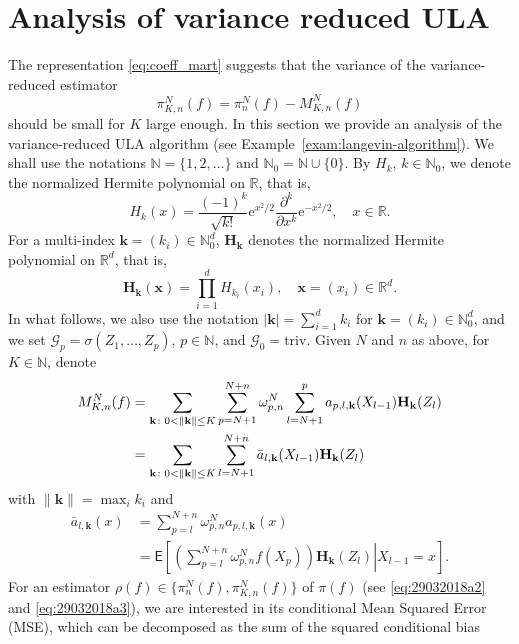 \documentclass[preprint]{imsart}
\def\rme{\mathrm{e}}
\begin{document}
\section{Analysis of variance reduced ULA}
\label{sec:ula_analysis}
The representation \eqref{eq:coeff_mart} suggests that the variance of  the  variance-reduced estimator
\begin{equation}
\label{eq:29032018a3}
\pi_{K,n}^N(f)=\pi_n^N(f)-M_{K,n}^N(f)
\end{equation}
should be small for \(K\) large enough. In this section   we provide  an analysis of the variance-reduced ULA  algorithm (see Example~\ref{exam:langevin-algorithm}).
We shall use the notations $\mathbb N=\{1,2,\ldots\}$ and $\mathbb N_0=\mathbb N\cup\{0\}$.
By $H_k$, $k\in\mathbb N_0$,
we denote the normalized Hermite polynomial on $\mathbb R$, that is,
$$
H_k(x)=\frac{(-1)^k}{\sqrt{k!}}\rme^{x^2/2}\frac{\partial^k}{\partial x^k}\rme^{-x^2/2},
\quad x\in\mathbb R.
$$
For a multi-index $\mathbf{k}=(k_i)\in\mathbb N_0^d$,
$\mathbf{H}_\mathbf{k}$ denotes the normalized Hermite polynomial on $\mathbb R^d$, that is,
$$
\mathbf{H}_\mathbf{k}(\mathbf{x})=\prod_{i=1}^d H_{k_i}(x_i),\quad \mathbf{x}=(x_i)\in\mathbb R^d.
$$
In what follows, we also use the notation
$|\mathbf{k}|=\sum_{i=1}^d k_i$ for $\mathbf{k}=(k_i)\in\mathbb N_0^d$,
and we set $\mathcal G_p=\sigma(Z_1,\ldots,Z_p)$, $p\in\mathbb N$, and $\mathcal G_0=\mathrm{triv}$.
Given $N$ and $n$ as above, for $K\in\mathbb N$, denote
\begin{align}
M_{K,n}^N(f) & =\sum_{\mathbf k\colon 0<\|\mathbf{k}\|\le K}\sum_{p=N+1}^{N+n}\omega_{p,n}^{N}\sum_{l=N+1}^{p}a_{p,l,\mathbf{k}}(X_{l-1})\mathbf{H}_\mathbf{k}(Z_{l})
\label{eq:29032018a5}\\
&=\sum_{\mathbf k\colon 0<\|\mathbf{k}\|\le K}\sum_{l=N+1}^{N+n}\bar{a}_{l,\mathbf{k}}(X_{l-1})\mathbf{H}_\mathbf{k}(Z_{l})
\notag
\end{align}
with \(\|\mathbf{k}\|=\max_{i} k_i\) and
\begin{align*}
\bar{a}_{l,\mathbf{k}}(x)
& =\sum_{p=l}^{N+n}\omega_{p,n}^{N}a_{p,l,\mathbf{k}}(x)\\
& =\mathsf{E}\left[\left.\left(\sum_{p=l}^{N+n}\omega_{p,n}^{N}f(X_{p})\right)\mathbf{H}_\mathbf{k}\left(Z_{l}\right)\right|X_{l-1}=x\right].
\end{align*}
For an estimator $\rho(f)\in\{\pi_n^N(f),\pi_{K,n}^N(f)\}$
of $\pi(f)$ (see \eqref{eq:29032018a2} and \eqref{eq:29032018a3}), we are interested in its conditional
Mean Squared Error (MSE),
which can be decomposed as the sum of the squared conditional bias
\end{document}
